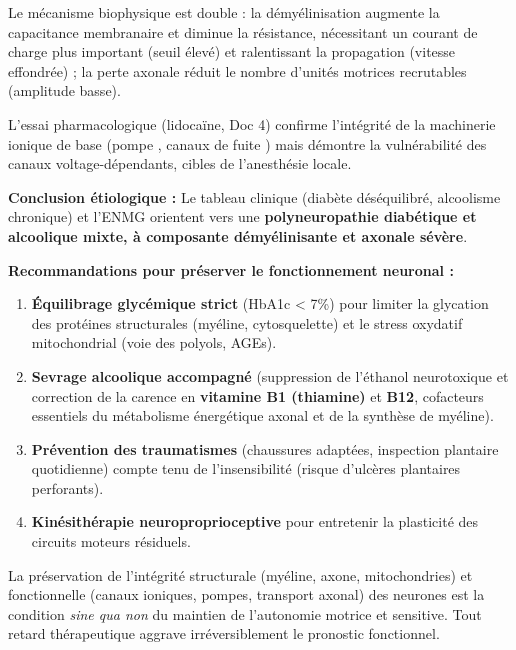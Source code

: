 \documentclass[11pt]{article}
\begin{document}
\begin{exoresolu}
Le mécanisme biophysique est double : la démyélinisation augmente la capacitance membranaire et diminue la résistance, nécessitant un courant de charge plus important (seuil élevé) et ralentissant la propagation (vitesse effondrée) ; la perte axonale réduit le nombre d'unités motrices recrutables (amplitude basse).

L'essai pharmacologique (lidocaïne, Doc 4) confirme l'intégrité de la machinerie ionique de base (pompe , canaux de fuite ) mais démontre la vulnérabilité des canaux  voltage-dépendants, cibles de l'anesthésie locale.

\textbf{Conclusion étiologique :} Le tableau clinique (diabète déséquilibré, alcoolisme chronique) et l'ENMG orientent vers une \textbf{polyneuropathie diabétique et alcoolique mixte, à composante démyélinisante et axonale sévère}.

\textbf{Recommandations pour préserver le fonctionnement neuronal :}
\begin{enumerate}
    \item \textbf{Équilibrage glycémique strict} (HbA1c < 7\%) pour limiter la glycation des protéines structurales (myéline, cytosquelette) et le stress oxydatif mitochondrial (voie des polyols, AGEs).
    \item \textbf{Sevrage alcoolique accompagné} (suppression de l'éthanol neurotoxique et correction de la carence en \textbf{vitamine B1 (thiamine)} et \textbf{B12}, cofacteurs essentiels du métabolisme énergétique axonal et de la synthèse de myéline).
    \item \textbf{Prévention des traumatismes} (chaussures adaptées, inspection plantaire quotidienne) compte tenu de l'insensibilité (risque d'ulcères plantaires perforants).
    \item \textbf{Kinésithérapie neuroproprioceptive} pour entretenir la plasticité des circuits moteurs résiduels.
\end{enumerate}
La préservation de l'intégrité structurale (myéline, axone, mitochondries) et fonctionnelle (canaux ioniques, pompes, transport axonal) des neurones est la condition \emph{sine qua non} du maintien de l'autonomie motrice et sensitive. Tout retard thérapeutique aggrave irréversiblement le pronostic fonctionnel.


\end{exoresolu}
\end{document}

